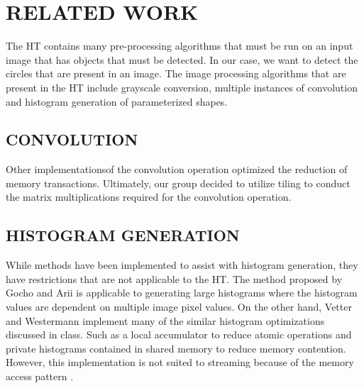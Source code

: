 \documentclass[12pt]{article}
\begin{document}
\section{\MakeUppercase{Related Work}}
\label{sec:relatedWork}
The HT contains many pre-processing algorithms that must be run on an input image that has objects that must be detected.
In our case, we want to detect the circles that are present in an image.
The image processing algorithms that are present in the HT include grayscale conversion, multiple instances of convolution and histogram generation of parameterized shapes.

\subsection{\MakeUppercase{Convolution}}
\label{sec:convolution}
Other implementations\cite{9229640}of the convolution operation optimized the reduction of memory transactions.
Ultimately, our group decided to utilize tiling to conduct the matrix multiplications required for the convolution operation.

\subsection{\MakeUppercase{Histogram Generation}}
\label{subsec:histogramGeneration}
While methods have been implemented to assist with histogram generation, they have restrictions that are not applicable to the HT. 
The method proposed by Gocho and Arii\cite{9324376} is applicable to generating large histograms where the histogram values are dependent on multiple image pixel values.
On the other hand, Vetter and Westermann implement many of the similar histogram optimizations discussed in class.
Such as a local accumulator to reduce atomic operations and private histograms contained in shared memory to reduce memory contention. 
However, this implementation is not suited to streaming because of the memory access pattern \cite{5872623}. 
\end{document}

